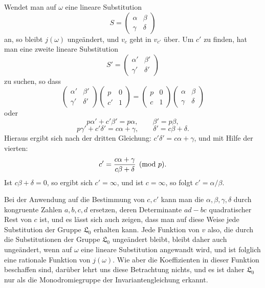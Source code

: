\documentclass[11pt]{article}
\begin{document}
Wendet man auf $\omega$ eine lineare Substitution
\[
 S=\begin{pmatrix}\alpha&\beta\\ \gamma&\delta\end{pmatrix}
\]
an, so bleibt $j(\omega)$ ungeändert, und $v_c$ geht in $v_{c'}$ über. Um $c'$ zu finden, hat man eine zweite lineare Substitution
\[
 S'=\begin{pmatrix}\alpha'&\beta'\\ \gamma'&\delta'\end{pmatrix}
\]
zu suchen, so dass
\[
\begin{pmatrix}\alpha'&\beta'\\ \gamma'&\delta'\end{pmatrix}
\begin{pmatrix}p&0\\ c'&1\end{pmatrix}
=
\begin{pmatrix}p&0\\ c&1\end{pmatrix}
\begin{pmatrix}\alpha&\beta\\ \gamma&\delta\end{pmatrix}
\]
oder
\[
 p\alpha'+c'\beta'=p\alpha,
 \qquad
 \beta'=p\beta,
\]
\[
 p\gamma'+c'\delta'=c\alpha+\gamma,
 \qquad
 \delta'=c\beta+\delta.
\]
Hieraus ergibt sich nach der dritten Gleichung: $c'\delta'=c\alpha+\gamma$, und mit Hilfe der vierten:
\[
 c'={c\alpha+\gamma\over c\beta+\delta}\pmod p.
\]
Ist $c\beta+\delta=0$, so ergibt sich $c'=\infty$, und ist $c=\infty$, so folgt $c'=\alpha/\beta$.

Bei der Anwendung auf die Bestimmung von $c,c'$ kann man die $\alpha,\beta,\gamma,\delta$ durch kongruente Zahlen $a,b,c,d$ ersetzen, deren Determinante $ad-bc$ quadratischer Rest von $c$ ist, und es lässt sich auch zeigen, dass man auf diese Weise jede Substitution der Gruppe $\mathfrak L_0$ erhalten kann. Jede Funktion von $v$ also, die durch die Substitutionen der Gruppe $\mathfrak L_0$ ungeändert bleibt, bleibt daher auch ungeändert, wenn auf $\omega$ eine lineare Substitution angewandt wird, und ist folglich eine rationale Funktion von $j(\omega)$. Wie aber die Koeffizienten in dieser Funktion beschaffen sind, darüber lehrt uns diese Betrachtung nichts, und es ist daher $\mathfrak L_0$ nur als die Monodromiegruppe der Invariantengleichung erkannt.
\end{document}
